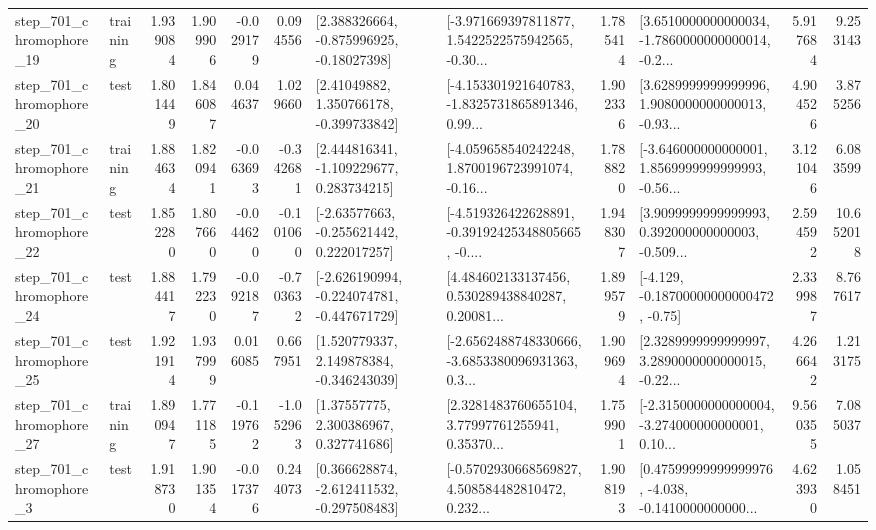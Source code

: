 \begin{tabular}{llrrrrllrlrr}
  step\_701\_chromophore\_19 &  training &      1.939084 &    1.909906 &     -0.029179 &  0.094556 &    [2.388326664, -0.875996925, -0.18027398] &  [-3.971669397811877, 1.5422522575942565, -0.30... &       1.785414 &  [3.6510000000000034, -1.7860000000000014, -0.2... &            5.917684 &          9.253143 \\
  step\_701\_chromophore\_20 &      test &      1.801449 &    1.846087 &      0.044637 &  1.029660 &     [2.41049882, 1.350766178, -0.399733842] &  [-4.153301921640783, -1.8325731865891346, 0.99... &       1.902336 &  [3.6289999999999996, 1.9080000000000013, -0.93... &            4.904526 &          3.875256 \\
  step\_701\_chromophore\_21 &  training &      1.884634 &    1.820941 &     -0.063693 & -0.342681 &    [2.444816341, -1.109229677, 0.283734215] &  [-4.059658540242248, 1.8700196723991074, -0.16... &       1.788820 &  [-3.646000000000001, 1.8569999999999993, -0.56... &            3.121046 &          6.083599 \\
  step\_701\_chromophore\_22 &      test &      1.852280 &    1.807660 &     -0.044620 & -0.101060 &    [-2.63577663, -0.255621442, 0.222017257] &  [-4.519326422628891, -0.39192425348805665, -0.... &       1.948307 &  [3.9099999999999993, 0.392000000000003, -0.509... &            2.594592 &         10.652018 \\
  step\_701\_chromophore\_24 &      test &      1.884417 &    1.792230 &     -0.092187 & -0.703632 &  [-2.626190994, -0.224074781, -0.447671729] &  [4.484602133137456, 0.530289438840287, 0.20081... &       1.899579 &              [-4.129, -0.18700000000000472, -0.75] &            2.339987 &          8.767617 \\
  step\_701\_chromophore\_25 &      test &      1.921914 &    1.937999 &      0.016085 &  0.667951 &    [1.520779337, 2.149878384, -0.346243039] &  [-2.6562488748330666, -3.6853380096931363, 0.3... &       1.909694 &  [2.3289999999999997, 3.2890000000000015, -0.22... &            4.266642 &          1.213175 \\
  step\_701\_chromophore\_27 &  training &      1.890947 &    1.771185 &     -0.119762 & -1.052963 &      [1.37557775, 2.300386967, 0.327741686] &  [2.3281483760655104, 3.77997761255941, 0.35370... &       1.759901 &  [-2.3150000000000004, -3.274000000000001, 0.10... &            9.560355 &          7.085037 \\
   step\_701\_chromophore\_3 &      test &      1.918730 &    1.901354 &     -0.017376 &  0.244073 &   [0.366628874, -2.612411532, -0.297508483] &  [-0.5702930668569827, 4.508584482810472, 0.232... &       1.908193 &  [0.47599999999999976, -4.038, -0.1410000000000... &            4.623930 &          1.058451 \\

\end{tabular}
